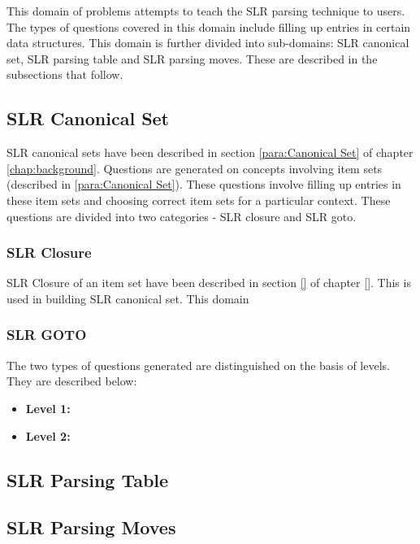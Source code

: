 This domain of problems attempts to teach the SLR parsing technique to users. The types of questions covered in this domain include filling up entries in certain data structures. This domain is further divided into sub-domains: SLR canonical set, SLR parsing table and SLR parsing moves. These are described in the subsections that follow. 

\subsection{SLR Canonical Set}
\label{subsec:slrcanonical}

SLR canonical sets have been described in section \ref{para:Canonical Set} of chapter \ref{chap:background}. Questions are generated on concepts involving item sets (described in \ref{para:Canonical Set}). These questions involve filling up entries in these  item sets and choosing correct item sets for a particular context. These questions are divided into two categories - SLR closure and SLR goto.

\subsubsection{SLR Closure}
\label{ssec:slrclosure}
SLR Closure of an item set have been described in section \ref{} of chapter \ref{}. This is used in building SLR canonical set. This domain 

\subsubsection{SLR GOTO}
\label{ssec:slrgoto}

The two types of questions generated are distinguished on the basis of levels. They are described below:
\begin{itemize}
\item \textbf{Level 1:}
\item \textbf{Level 2:}
\end{itemize}

\subsection{SLR Parsing Table}
\label{subsec:slrtable}

\subsection{SLR Parsing Moves}
\label{subsec:slrmoves}

